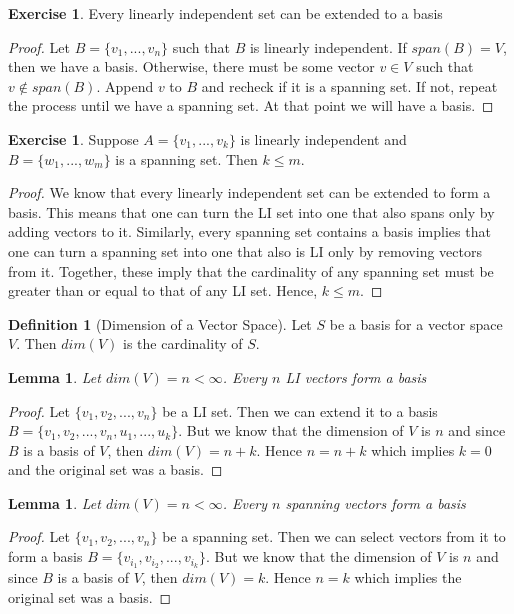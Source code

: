 \documentclass{tufte-handout}
\newtheorem{lem}[thm]{Lemma}
\theoremstyle{definition}
\newtheorem{defn}[thm]{Definition}
\newtheorem{exer}[thm]{Exercise}
\theoremstyle{remark}
\begin{document}
\begin{exer}Every linearly independent set can be extended to a basis \end{exer}
\begin{proof}
Let $B = \{v_1, ..., v_n\}$ such that $B$ is linearly independent. If $span(B) = V$, then we have a basis. Otherwise, there must be some vector $v \in V$ such that $v \not\in span(B)$. Append $v$ to $B$ and recheck if it is a spanning set. If not, repeat the process until we have a spanning set. At that point we will have a basis.
\end{proof}

\begin{exer}
Suppose $A = \{v_1, ... , v_k\}$ is linearly independent and $B = \{w_1, ... , w_m\}$ is a spanning set. Then $k \leq m$. 
\end{exer}
\begin{proof}
We know that every linearly independent set can be extended to form a basis. This means that one can turn the LI set into one that also spans only by adding vectors to it. Similarly, every spanning set contains a basis implies that one can turn a spanning set into one that also is LI only by removing vectors from it. Together, these imply that the cardinality of any spanning set must be greater than or equal to that of any LI set. Hence, $k \leq m$.

\end{proof}

\begin{defn}[Dimension of a Vector Space]
Let $S$ be a basis for a vector space $V$. Then $dim(V)$ is the cardinality of $S$.
\end{defn}

\begin{lem}
Let $dim(V) = n < \infty$. Every $n$ LI vectors form a basis
\end{lem}

\begin{proof}
Let $\{v_1, v_2, ..., v_n\}$ be a LI set. Then we can extend it to a basis $B = \{v_1, v_2, ..., v_n, u_1, ..., u_k\}$. But we know that the dimension of $V$ is $n$ and since $B$ is a basis of $V$, then $dim(V) = n+k$. Hence $n = n+k$ which implies $k = 0$ and the original set was a basis. 
\end{proof}


\begin{lem}Let $dim(V) = n < \infty$. Every $n$ spanning vectors form a basis\end{lem}
\begin{proof}
Let $\{v_1, v_2, ..., v_n\}$ be a spanning set. Then we can select vectors from it to form a basis $B = \{v_{i_1}, v_{i_2}, ..., v_{i_k} \}$. But we know that the dimension of $V$ is $n$ and since $B$ is a basis of $V$, then $dim(V) = k$. Hence $n = k$ which implies the original set was a basis. 

\end{proof}
\end{document}
